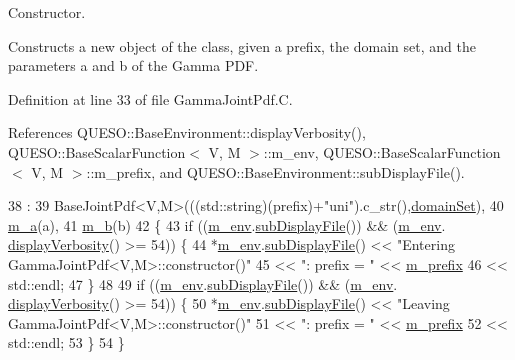 Constructor. 

Constructs a new object of the class, given a prefix, the domain set, and the parameters {\ttfamily a} and {\ttfamily b} of the Gamma P\-D\-F. 

Definition at line 33 of file Gamma\-Joint\-Pdf.\-C.



References Q\-U\-E\-S\-O\-::\-Base\-Environment\-::display\-Verbosity(), Q\-U\-E\-S\-O\-::\-Base\-Scalar\-Function$<$ V, M $>$\-::m\-\_\-env, Q\-U\-E\-S\-O\-::\-Base\-Scalar\-Function$<$ V, M $>$\-::m\-\_\-prefix, and Q\-U\-E\-S\-O\-::\-Base\-Environment\-::sub\-Display\-File().


\begin{DoxyCode}
38   :
39   BaseJointPdf<V,M>(((std::string)(prefix)+\textcolor{stringliteral}{"uni"}).c\_str(),\hyperlink{class_q_u_e_s_o_1_1_base_scalar_function_ad0937628825249dd36ded3ce0c7959ac}{domainSet}),
40   \hyperlink{class_q_u_e_s_o_1_1_gamma_joint_pdf_ab7120940a19b96f70ffde24ddc22cf20}{m\_a}(a),
41   \hyperlink{class_q_u_e_s_o_1_1_gamma_joint_pdf_ad651745cadab6db31b6458ad8f72c570}{m\_b}(b)
42 \{
43   \textcolor{keywordflow}{if} ((\hyperlink{class_q_u_e_s_o_1_1_base_scalar_function_adf44141aeb765d97613286f88f235f04}{m\_env}.\hyperlink{class_q_u_e_s_o_1_1_base_environment_a8a0064746ae8dddfece4229b9ad374d6}{subDisplayFile}()) && (\hyperlink{class_q_u_e_s_o_1_1_base_scalar_function_adf44141aeb765d97613286f88f235f04}{m\_env}.
      \hyperlink{class_q_u_e_s_o_1_1_base_environment_a1fe5f244fc0316a0ab3e37463f108b96}{displayVerbosity}() >= 54)) \{
44     *\hyperlink{class_q_u_e_s_o_1_1_base_scalar_function_adf44141aeb765d97613286f88f235f04}{m\_env}.\hyperlink{class_q_u_e_s_o_1_1_base_environment_a8a0064746ae8dddfece4229b9ad374d6}{subDisplayFile}() << \textcolor{stringliteral}{"Entering GammaJointPdf<V,M>::constructor()"}
45                             << \textcolor{stringliteral}{": prefix = "} << \hyperlink{class_q_u_e_s_o_1_1_base_scalar_function_a6e81dc902aca6a546877da99b2f4a169}{m\_prefix}
46                             << std::endl;
47   \}
48 
49   \textcolor{keywordflow}{if} ((\hyperlink{class_q_u_e_s_o_1_1_base_scalar_function_adf44141aeb765d97613286f88f235f04}{m\_env}.\hyperlink{class_q_u_e_s_o_1_1_base_environment_a8a0064746ae8dddfece4229b9ad374d6}{subDisplayFile}()) && (\hyperlink{class_q_u_e_s_o_1_1_base_scalar_function_adf44141aeb765d97613286f88f235f04}{m\_env}.
      \hyperlink{class_q_u_e_s_o_1_1_base_environment_a1fe5f244fc0316a0ab3e37463f108b96}{displayVerbosity}() >= 54)) \{
50     *\hyperlink{class_q_u_e_s_o_1_1_base_scalar_function_adf44141aeb765d97613286f88f235f04}{m\_env}.\hyperlink{class_q_u_e_s_o_1_1_base_environment_a8a0064746ae8dddfece4229b9ad374d6}{subDisplayFile}() << \textcolor{stringliteral}{"Leaving GammaJointPdf<V,M>::constructor()"}
51                             << \textcolor{stringliteral}{": prefix = "} << \hyperlink{class_q_u_e_s_o_1_1_base_scalar_function_a6e81dc902aca6a546877da99b2f4a169}{m\_prefix}
52                             << std::endl;
53   \}
54 \}
\end{DoxyCode}
